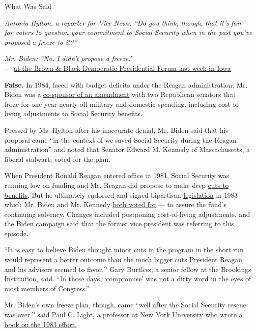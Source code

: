 What Was Said

\emph{Antonia Hylton, a reporter for Vice News: ``Do you think, though,
that it's fair for voters to question your commitment to Social Security
when in the past you've proposed a freeze to it?''}

\emph{Mr. Biden: ``No, I didn't propose a freeze.''}\\
\emph{---}
\href{https://www.facebookcorewwwi.onion/vicenews/videos/2770644399662900/}{at
the Brown \& Black Democratic Presidential Forum last week in Iowa}

\textbf{False.} In 1984, faced with budget deficits under the Reagan
administration, Mr. Biden was a
\href{https://www.nytimes3xbfgragh.onion/1984/05/03/us/senators-reject-spending-freeze.html}{co-sponsor
of an amendment} with two Republican senators that froze for one year
nearly all military and domestic spending, including cost-of-living
adjustments to Social Security benefits.

Pressed by Ms. Hylton after his inaccurate denial, Mr. Biden said that
his proposal came ``in the context of we saved Social Security during
the Reagan administration'' and noted that Senator Edward M. Kennedy of
Massachusetts, a liberal stalwart, voted for the plan.

When President Ronald Reagan entered office in 1981, Social Security was
running low on funding and Mr. Reagan did propose to make deep
\href{https://www.nytimes3xbfgragh.onion/1981/05/13/us/first-major-cuts-in-social-security-proposed-in-detailed-reagan-plan.html}{cuts
to benefits}. But he ultimately endorsed and signed bipartisan
\href{https://www.ssa.gov/policy/docs/ssb/v46n7/v46n7p3.pdf}{legislation}
in 1983 --- which Mr. Biden and Mr. Kennedy
\href{https://www.ssa.gov/history/tally1983.html}{both voted for} --- to
assure the fund's continuing solvency. Changes included postponing
cost-of-living adjustments, and the Biden campaign said that the former
vice president was referring to this episode.

``It is easy to believe Biden thought minor cuts in the program in the
short run would represent a better outcome than the much bigger cuts
President Reagan and his advisers seemed to favor,'' Gary Burtless, a
senior fellow at the Brookings Institution, said. ``In those days,
`compromise' was not a dirty word in the eyes of most members of
Congress.''

Mr. Biden's own freeze plan, though, came ``well after the Social
Security rescue was over,'' said Paul C. Light, a professor at New York
University who wrote
\href{https://www.nytimes3xbfgragh.onion/1985/04/21/books/concealing-dealing.html}{a
book on the 1983 effort.}

